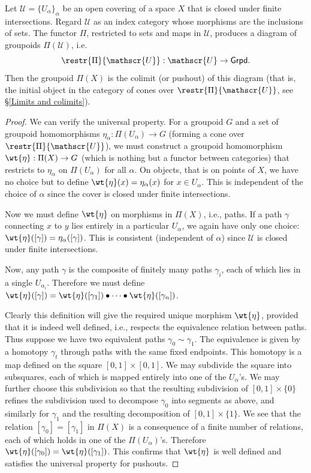 \begin{thm}
    Let $\mathscr{U}=\{U_\alpha\}_\alpha$ be an open covering of a space $X$ that is closed under finite intersections. Regard $\mathscr{U}$ as an index category whose morphisms are the inclusions of sets. The functor $\Pi$, restricted to sets and maps in $\mathscr{U}$, produces a diagram of groupoids $\Pi(\mathscr{U})$, i.e.
    \[\restr{\Pi}{\mathscr{U}}: \mathscr{U}\to \mathsf{Grpd}.\]
    Then the groupoid $\Pi(X)$ is the colimit (or pushout) of this diagram (that is, the initial object in the category of cones over $\restr{\Pi}{\mathscr{U}}$, see \S\ref{Limits and colimits}).
\end{thm}
\begin{proof}
    We can verify the universal property. For a groupoid $G$ and a set of groupoid homomorphisms $\eta_\alpha:\Pi(U_\alpha)\to G$ (forming a cone over $\restr{\Pi}{\mathscr{U}}$), we must construct a groupoid homomorphism $\wt{\eta}:\Pi(X)\to G$ (which is nothing but a functor between categories) that restricts to $\eta_\alpha$ on $\Pi(U_\alpha)$ for all $\alpha$. On objects, that is on points of $X$, we have no choice but to define $\wt{\eta}(x)=\eta_\alpha(x)$ for $x\in U_\alpha$. This is independent of the choice of $\alpha$ since the cover is closed under finite intersections.

    Now we must define $\wt{\eta}$ on morphisms in $\Pi(X)$, i.e., paths. If a path $\gamma$ connecting $x$ to $y$ lies entirely in a particular $U_\alpha$, we again have only one choice: $\wt{\eta}([\gamma])=\eta_\alpha([\gamma])$. This is consistent (independent of $\alpha$) since $\mathscr{U}$ is closed under finite intersections.

    Now, any path $\gamma$ is the composite of finitely many paths $\gamma_i$, each of which lies in a single $U_{\alpha_i}$. Therefore we must define $\wt{\eta}([\gamma])=\wt{\eta}([\gamma_1])\bullet \cdots \bullet \wt{\eta}([\gamma_n])$. 

    Clearly this definition will give the required unique morphism $\wt{\eta}$, provided that it is indeed well defined, i.e., respects the equivalence relation between paths. Thus suppose we have two equivalent paths $\gamma_0\sim \gamma_1$. The equivalence is given by a homotopy $\gamma_t$ through paths with the same fixed endpoints. This homotopy is a map defined on the square $[0,1]\times[0,1]$. We may subdivide the square into subsquares, each of which is mapped entirely into one of the $U_\alpha$'s. We may further choose this subdivision so that the resulting subdivision of $[0,1]\times\{0\}$ refines the subdivision used to decompose $\gamma_0$ into segments as above, and similarly for $\gamma_1$ and the resulting decomposition of $[0,1]\times \{1\}$. We see that the relation $[\gamma_0]=[\gamma_1]$ in $\Pi(X)$ is a consequence of a finite number of relations, each of which holds in one of the $\Pi(U_\alpha)$'s. Therefore $\wt{\eta}([\gamma_0])=\wt{\eta}([\gamma_1])$. This confirms that $\wt{\eta}$ is well defined and satisfies the universal property for pushouts.    
\end{proof}
